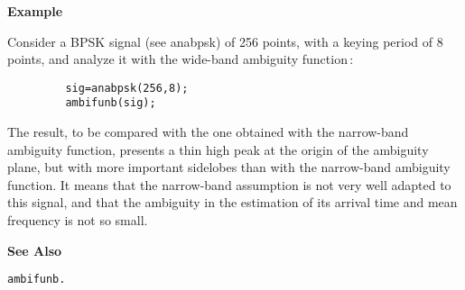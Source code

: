 \newpage

{\bf \large {}\selectfont Example}\\
\hspace*{1.5cm}
\begin{minipage}[t]{13.5cm}
Consider a BPSK signal (see {\ty anabpsk}) of 256 points, with a keying
period of 8 points, and analyze it with the wide-band ambiguity
function\,:
\begin{verbatim}
         sig=anabpsk(256,8);
         ambifunb(sig);
\end{verbatim}
The result, to be compared with the one obtained with the narrow-band
ambiguity function, presents a thin high peak at the origin of the
ambiguity plane, but with more important sidelobes than with the
narrow-band ambiguity function. It means that the narrow-band assumption is
not very well adapted to this signal, and that the ambiguity in the
estimation of its arrival time and mean frequency is not so small.
\end{minipage}
\vspace*{.5cm}


{\bf \large {}\selectfont See Also}\\
\hspace*{1.5cm}
\begin{minipage}[t]{13.5cm}
\begin{verbatim}
ambifunb.
\end{verbatim}
\end{minipage}

